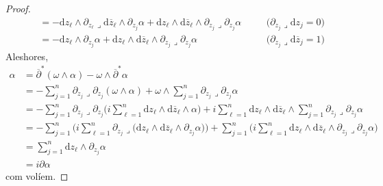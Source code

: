 \begin{proposicio}
\begin{proof}
\begin{align*}
            &=-\textrm{d}z_{\ell}\wedge\partial_{z_{\ell}}\lrcorner\textrm{d}\overline{z}_{\ell}\wedge
            \partial_{z_{j}}\alpha
            +\textrm{d}z_{\ell}\wedge\textrm{d}\overline{z}_{\ell}\wedge\partial_{z_{j}}\lrcorner\partial_{z_{j}}\alpha
            &\quad&\textrm{($\partial_{z_{j}}\lrcorner\textrm{d}z_{j}=0$)}\\
            &=-\textrm{d}z_{\ell}\wedge
            \partial_{z_{j}}\alpha
            +\textrm{d}z_{\ell}\wedge\textrm{d}\overline{z}_{\ell}\wedge\partial_{z_{j}}\lrcorner\partial_{z_{j}}\alpha
            &\quad&\textrm{($\partial_{z_{j}}\lrcorner\textrm{d}\overline{z}_{j}=1$)}
        \end{align*}
        Aleshores,
        \begin{align*}
            [\overline{\partial}^{*},L]\alpha
            &=\overline{\partial}^{*}(\omega\wedge\alpha)
            -\omega\wedge\overline{\partial}^{*}\alpha\\
            &=-\sum_{j=1}^{n}\partial_{z_{j}}\lrcorner\partial_{z_{j}}(\omega\wedge\alpha)
            +\omega\wedge\sum_{j=1}^{n}\partial_{z_{j}}\lrcorner\partial_{z_{j}}\alpha\\
            &=-\sum_{j=1}^{n}\partial_{z_{j}}\lrcorner\partial_{z_{j}}\Big(i\sum_{\ell=1}^{n}\textrm{d}z_{\ell}\wedge\textrm{d}\overline{z}_{\ell}\wedge\alpha\Big)
            +i\sum_{\ell=1}^{n}\textrm{d}z_{\ell}\wedge\textrm{d}\overline{z}_{\ell}\wedge\sum_{j=1}^{n}\partial_{z_{j}}\lrcorner\partial_{z_{j}}\alpha\\
            &=-\sum_{j=1}^{n}\Big(i\sum_{\ell=1}^{n}\partial_{z_{j}}\lrcorner\big(\textrm{d}z_{\ell}\wedge\textrm{d}\overline{z}_{\ell}\wedge\partial_{z_{j}}\alpha\big)\Big)
            +\sum_{j=1}^{n}\Big(i\sum_{\ell=1}^{n}\textrm{d}z_{\ell}\wedge\textrm{d}\overline{z}_{\ell}\wedge\partial_{z_{j}}\lrcorner\partial_{z_{j}}\alpha\Big)\\
            &=\sum_{j=1}^{n}\textrm{d}z_{\ell}\wedge
            \partial_{z_{j}}\alpha\\
            &=i\partial\alpha
        \end{align*}
        com volíem.
    \end{proof}
\end{proposicio}
